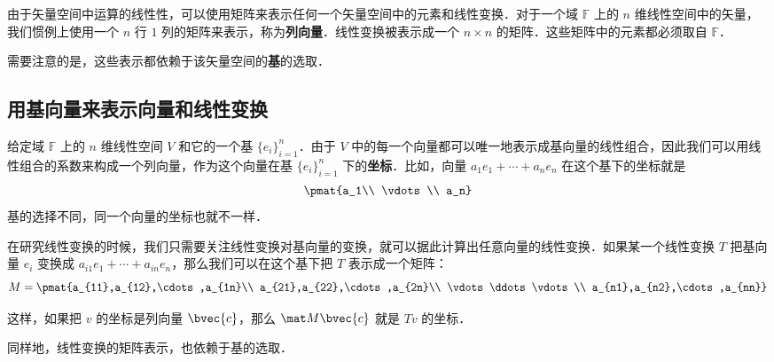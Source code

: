 
\begin{issues}
\end{issues}


由于矢量空间中运算的线性性，可以使用矩阵来表示任何一个矢量空间中的元素和线性变换．对于一个域 $\mathbb{F}$ 上的 $n$ 维线性空间中的矢量，我们惯例上使用一个 $n$ 行 $1$ 列的矩阵来表示，称为\textbf{列向量}．线性变换被表示成一个 $n\times n$ 的矩阵．这些矩阵中的元素都必须取自 $\mathbb{F}$．

需要注意的是，这些表示都依赖于该矢量空间的\textbf{基}的选取．


\subsection{用基向量来表示向量和线性变换}

给定域 $\mathbb{F}$ 上的 $n$ 维线性空间 $V$ 和它的一个基 $\{{e}_i\}_{i=1}^{n}$．由于 $V$ 中的每一个向量都可以唯一地表示成基向量的线性组合，因此我们可以用线性组合的系数来构成一个列向量，作为这个向量在基 $\{{e}_i\}_{i=1}^{n}$ 下的\textbf{坐标}．比如，向量 $a_1 {e}_1+\cdots+a_n {e}_n$ 在这个基下的坐标就是
\begin{equation}
\pmat{a_1\\ \vdots\\ a_n}
\end{equation}
基的选择不同，同一个向量的坐标也就不一样．

在研究线性变换的时候，我们只需要关注线性变换对基向量的变换，就可以据此计算出任意向量的线性变换．如果某一个线性变换 $T$ 把基向量 ${e}_i$ 变换成 $a_{i1} {e}_1+\cdots+a_{in} {e}_n$，那么我们可以在这个基下把 $T$ 表示成一个矩阵：
\begin{equation}
M=\pmat{a_{11},a_{12},\cdots,a_{1n}\\ a_{21},a_{22},\cdots,a_{2n}\\ \vdots\ddots\vdots\\ a_{n1},a_{n2},\cdots,a_{nn}}
\end{equation}

这样，如果把 ${v}$ 的坐标是列向量 $\bvec {c}$，那么 $\mat M\bvec{c}$ 就是 $T{v}$ 的坐标．

同样地，线性变换的矩阵表示，也依赖于基的选取．
